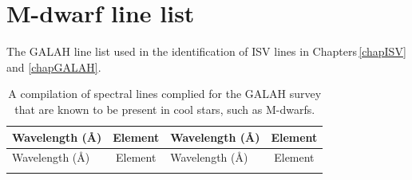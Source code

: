 \chapter{M-dwarf line list}
The GALAH line list used in the identification of ISV lines in Chapters\,\ref{chapISV} and \ref{chapGALAH}.\\

\begin{longtable}[c]{|l|c|l|c|}
    \hline
    Wavelength (\hbox{\AA}) & Element & Wavelength (\hbox{\AA}) & Element\\
    \hline
    \endfirsthead
    
    \hline
    Wavelength (\hbox{\AA}) & Element & Wavelength (\hbox{\AA}) & Element\\
    \hline
    \endhead
    
    \hline
     \caption{A compilation of spectral lines complied for the GALAH survey that are known to be present in cool stars, such as M-dwarfs.}
    \endfoot
    

\end{longtable}
